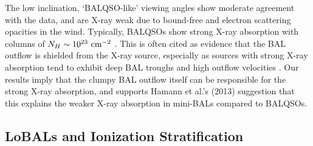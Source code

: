 \documentclass[useAMS,usenatbib]{mn2e_x}
\begin{document}
The low inclination, `BALQSO-like' viewing angles show moderate agreement with the data,
and are X-ray weak due to bound-free and electron scattering opacities in the wind.
Typically, BALQSOs show strong X-ray absorption with columns 
of $N_H\sim10^{23}~\rm{cm^{-2}}$ 
\citep{green1996,mathur2000,green2001,grupemathur2003}.
This is often cited as evidence that the BAL outflow is shielded from
the X-ray source, especially as sources with strong X-ray absorption tend
to exhibit deep BAL troughs and high outflow velocities 
\citep{brandt2000,laorbrandt2002,gallagher2006}.
Our results imply that the clumpy BAL outflow
itself can be responsible for the strong X-ray absorption, 
and supports Hamann et al.'s (2013) suggestion that 
this explains the weaker X-ray absorption in mini-BALs 
compared to BALQSOs.


\subsection{LoBALs and Ionization Stratification}
\end{document}
